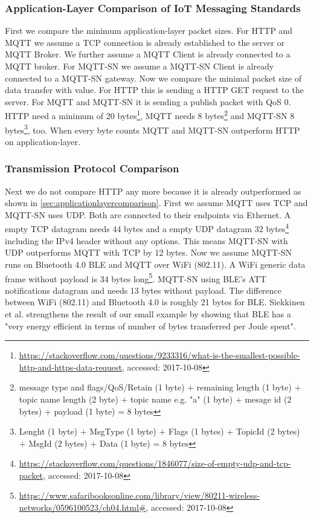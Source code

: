 \subsubsection{Application-Layer Comparison of IoT Messaging Standards}\label{sec:applicationlayercomparison}
First we compare the minimum application-layer packet sizes.
For HTTP and MQTT we assume a TCP connection is already established to the server or MQTT Broker.
We further assume a MQTT Client is already connected to a MQTT broker.
For MQTT-SN we assume a MQTT-SN Client is already connected to a MQTT-SN gateway.
Now we compare the minimal packet size of data transfer with value.
For HTTP this is sending a HTTP GET request to the server. For MQTT and MQTT-SN it is sending a publish packet with QoS 0.
HTTP need a minimum of 20 bytes\footnote{\url{https://stackoverflow.com/questions/9233316/what-is-the-smallest-possible-http-and-https-data-request}, accessed: 2017-10-08}, MQTT needs 8 bytes\footnote{message type and flags/QoS/Retain (1 byte) + remaining length (1 byte) + topic name length (2 byte) + topic name e.g. "a" (1 byte) + mesage id (2 bytes) + payload (1 byte) = 8 bytes} and MQTT-SN 8 bytes\footnote{Lenght (1 byte) + MsgType (1 byte) + Flags (1 bytes) + TopicId (2 bytes) + MsgId (2 bytes) + Data (1 byte) = 8 bytes}, too.
When every byte counts MQTT and MQTT-SN outperform HTTP on application-layer.
\subsubsection{Transmission Protocol Comparison}
Next we do not compare HTTP any more because it is already outperformed as shown in \autoref{sec:applicationlayercomparison}.
First we assume MQTT uses TCP and MQTT-SN uses UDP.
Both are connected to their endpoints via Ethernet.
A empty TCP datagram needs 44 bytes and a empty UDP datagram 32 bytes\footnote{\url{https://stackoverflow.com/questions/1846077/size-of-empty-udp-and-tcp-packet}, accessed: 2017-10-08} including the IPv4 header without any options.
This means MQTT-SN with UDP outperforms MQTT with TCP by 12 bytes.
Now we assume MQTT-SN runs on Bluetooth 4.0 BLE and MQTT over WiFi (802.11).
A WiFi generic data frame without payload is 34 bytes long\footnote{\url{https://www.safaribooksonline.com/library/view/80211-wireless-networks/0596100523/ch04.html\#}, accessed: 2017-10-08}.
MQTT-SN using BLE's ATT notifications datagram and needs 13 bytes without payload.
The difference between WiFi (802.11) and Bluetooth 4.0 is roughly 21 bytes for BLE\cite{howlowenergyisblelowenergy}.
Siekkinen et al. \cite{howlowenergyisblelowenergy} strengthens the result of our small example by showing that BLE has a "very energy efficient in terms of number of bytes transferred per Joule spent"\cite[p.1]{howlowenergyisblelowenergy}.

